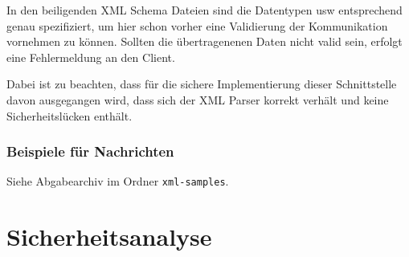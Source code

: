 \documentclass[12pt,a4paper,titlepage,oneside]{scrartcl}
\begin{document}
In den beiligenden XML Schema Dateien sind die Datentypen usw entsprechend genau spezifiziert, um hier schon vorher eine Validierung der Kommunikation vornehmen zu können.
Sollten die übertragenenen Daten nicht valid sein, erfolgt eine Fehlermeldung an den Client.

Dabei ist zu beachten, dass für die sichere Implementierung dieser Schnittstelle davon ausgegangen wird, dass sich der XML Parser korrekt verhält und keine Sicherheitslücken enthält.

\subsubsection{Beispiele für Nachrichten}
Siehe Abgabearchiv im Ordner \texttt{xml-samples}.

\section{Sicherheitsanalyse}
\end{document}
